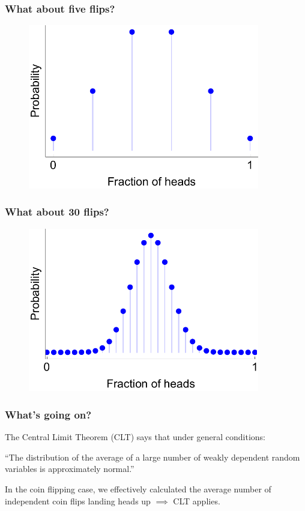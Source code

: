 \documentclass{beamer}
\begin{document}
	\begin{frame}
		\frametitle{What about five flips?}
		
		\begin{figure}[ht]
			\centerline{\includegraphics[width=0.9\textwidth]{./figures/binomial_5.pdf}}
		\end{figure}
		
	\end{frame}
	
	\begin{frame}
		\frametitle{What about 30 flips?}
		
		\begin{figure}[ht]
			\centerline{\includegraphics[width=0.9\textwidth]{./figures/binomial_30.pdf}}
		\end{figure}
		
	\end{frame}
	
	\begin{frame}
		\frametitle{What's going on?}
		The Central Limit Theorem (CLT) says that under general conditions:
		
		\vspace{0.5cm}
		
		``The distribution of the average of a large number of weakly dependent random variables is approximately normal.''
		
		\vspace{0.5cm}
		
		In the coin flipping case, we effectively calculated the average number of independent coin flips landing heads up $\implies$ CLT applies.
		
	\end{frame}
	
\end{document}
